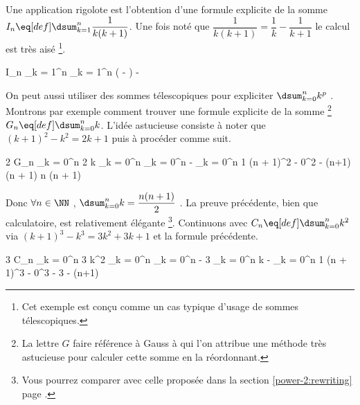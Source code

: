 Une application rigolote est l'obtention d'une formule explicite de la somme $I_n \eq[def] \dsum_{k = 1}^{n} \dfrac{1}{k(k+1)}$. 
Une fois noté que $\dfrac{1}{k(k+1)} = \dfrac{1}{k} -  \dfrac{1}{k+1}$
le calcul est très aisé
\footnote{
	Cet exemple est conçu comme un cas typique d'usage de sommes télescopiques.
}.

\medskip

\begin{stepcalc}[style = sar]
	I_n \explnext[{\eq[def]}]{}
	\dsum_{k = 1}^{n} 
		\explnext{}
	\dsum_{k = 1}^{n} \left(  -  \right)
	 - 
		\explnext{}
\end{stepcalc}


\bigskip

On peut aussi utiliser des sommes télescopiques pour expliciter $\dsum_{k = 0}^{n} k^p$ .
Montrons par exemple comment trouver une formule explicite de la somme
\footnote{
	La lettre $G$ faire référence à Gauss à qui l'on attribue une méthode très astucieuse pour calculer cette somme en la réordonnant.
}
$G_n \eq[def] \dsum_{k = 0}^{n} k$.
L'idée astucieuse consiste à noter que $(k+1)^2 - k^2 = 2 k + 1$ puis à procéder comme suit.

\medskip

\begin{stepcalc}[style = sar]
	2 G_n
		\explnext{}
	\dsum_{k = 0}^{n} 2 k
		\explnext{}
	\dsum_{k = 0}^{n} \big[ \, (k+1)^2 - k^2 - 1 \, \big]
		\explnext{}
	\dsum_{k = 0}^{n} \big[ \, (k+1)^2 - k^2 \, \big] - \dsum_{k = 0}^{n} 1
	(n + 1)^2 - 0^2 - (n+1)
		\explnext{}
	(n + 1) \cdot \big[ \, (n + 1) - 1 \, \big]
		\explnext{}
	n (n + 1)
\end{stepcalc}

\bigskip

Donc
$\forall n \in \NN$ , $\dsum_{k = 0}^{n} k = \dfrac{n(n + 1)}{2}$ .
La preuve précédente, bien que calculatoire, est relativement élégante
\footnote{
	Vous pourrez comparer avec celle proposée dans la section \ref{power-2:rewriting} page \pageref{power-2:rewriting}.
}.
Continuons avec $C_n \eq[def] \dsum_{k = 0}^{n} k^2$
via $(k+1)^3 - k^3 = 3 k^2 + 3 k + 1$
et la formule précédente.

\medskip

\begin{stepcalc}[style = sar]
	3 C_n
		\explnext{}
	\dsum_{k = 0}^{n} 3 k^2
		\explnext{}
	\dsum_{k = 0}^{n} \big[ \, (k+1)^3 - k^3 - 3 k - 1 \, \big]
		\explnext{}
	\dsum_{k = 0}^{n} \big[ \, (k+1)^3 - k^3 \, \big] - 3 \dsum_{k = 0}^{n} k - \dsum_{k = 0}^{n} 1
	(n + 1)^3 - 0^3 - 3 \cdot {} - (n+1)
		\explnext{}
	 \cdot \big[ \, 2 (n + 1)^2 - 3n - 2 \, \big]
		\explnext{}
	 \cdot \big[ \, 2 (n^2 + 2 n + 1) - 3n - 2 \, \big]
		\explnext{}
		\explnext{}
\end{stepcalc}


